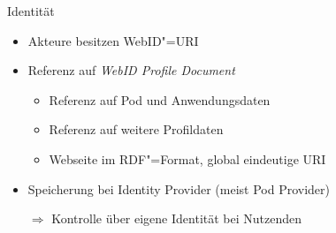 \begin{frame}{Identität}
    \begin{itemize}
        \item Akteure besitzen WebID"=URI~\cite{sambraSolidPlatformDecentralized2016}
        
        \item Referenz auf \emph{WebID Profile Document}~\cite{sambraSolidPlatformDecentralized2016,solidcommunitygroupSolidemblemsvg2019}
        \begin{itemize}
            \item Referenz auf Pod und Anwendungsdaten~\cite{solidcommunitygroupSolidWebIDProfile2024}
            \item Referenz auf weitere Profildaten~\cite{solidcommunitygroupSolidWebIDProfile2024}
            \item Webseite im RDF"=Format, global eindeutige URI~\cite{sambraSolidPlatformDecentralized2016}
        \end{itemize}
        
        \item Speicherung bei Identity Provider (meist Pod Provider)~\cite{sambraSolidPlatformDecentralized2016}
        \item[$\Rightarrow$] Kontrolle über eigene Identität bei Nutzenden~\cite{sambraSolidPlatformDecentralized2016}
    \end{itemize}
\end{frame}


